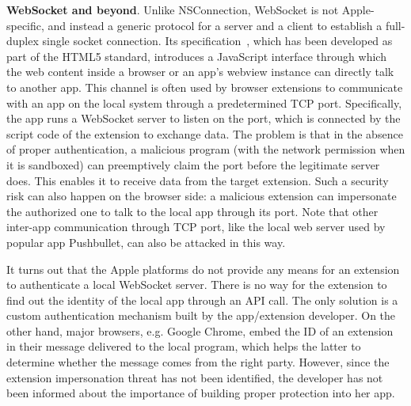 \documentclass{article}
\newcommand{\ignore}[1]{}
\begin{document}
\vspace {3pt}\noindent\textbf{WebSocket and beyond}. Unlike NSConnection, WebSocket is not Apple-specific, and instead a generic protocol for a server and a client to establish a full-duplex single socket connection. Its specification~\cite{WebSocket}, which has been developed as part of the HTML5 standard, introduces a JavaScript interface through which the web content inside a browser or an app's webview instance can directly talk to another app. This channel is often used by browser extensions to communicate with an app on the local system through a predetermined TCP port. Specifically, the app runs a WebSocket server to listen on the port, which is connected by the script code of the extension to exchange data. The problem is that in the absence of proper authentication, a malicious program (with the network permission when it is sandboxed) can preemptively claim the port before the legitimate server does. This enables it to receive data from the target extension.  Such a security risk can also happen on the browser side: a malicious extension can impersonate the authorized one to talk to the local app through its port. Note that other inter-app communication through TCP port, like the local web server used by popular app Pushbullet, can also be attacked in this way.

It turns out that the Apple platforms do not provide any means for an extension to authenticate a local WebSocket server. There is no way for the extension to find out the identity of the local app through an API call.  The only solution is a custom authentication mechanism built by the app/extension developer.  On the other hand, major browsers, e.g. Google Chrome, embed the ID of an extension in their message delivered to the local program, which helps the latter to determine whether the message comes from the right party.\ignore{ Note that this is not a common feature.  Other browsers, such as Firefox, do not provide such information.}  However, since the extension impersonation threat has not been identified, the developer has not been informed about the importance of building proper protection into her app.
\end{document}
